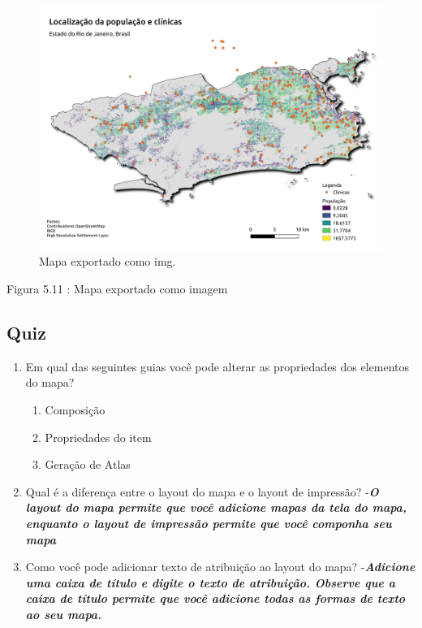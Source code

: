 \documentclass[
]{krantz}
\providecommand{\tightlist}{%
  \setlength{\itemsep}{0pt}\setlength{\parskip}{0pt}}
\begin{document}
\begin{figure}
\centering
\includegraphics{media/modulo5/exported-map.png}
\caption{Mapa exportado como img.}
\end{figure}

Figura 5.11 : Mapa exportado como imagem

\hypertarget{quiz-13}{%
\subsection{Quiz}\label{quiz-13}}

\begin{enumerate}
\def\labelenumi{\arabic{enumi}.}
\item
  Em qual das seguintes guias você pode alterar as propriedades dos elementos do mapa?

  \begin{enumerate}
  \def\labelenumii{\alph{enumii}.}
  \tightlist
  \item
    Composição
  \item
    Propriedades do item
  \item
    Geração de Atlas
  \end{enumerate}
\item
  Qual é a diferença entre o layout do mapa e o layout de impressão? -\textbf{\emph{O layout do mapa permite que você adicione mapas da tela do mapa, enquanto o layout de impressão permite que você componha seu mapa}}
\item
  Como você pode adicionar texto de atribuição ao layout do mapa? -\textbf{\emph{Adicione uma caixa de título e digite o texto de atribuição. Observe que a caixa de título permite que você adicione todas as formas de texto ao seu mapa.}}
\end{enumerate}
\end{document}
